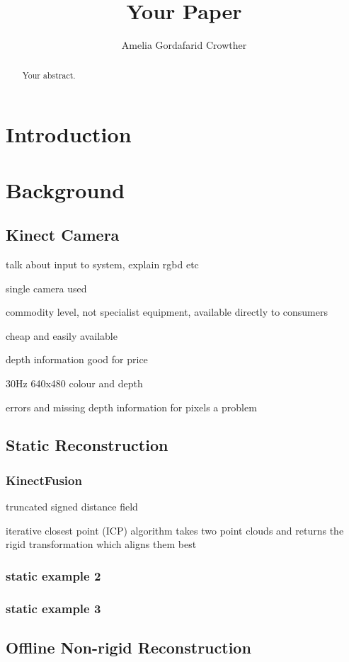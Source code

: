 \documentclass[a4paper]{article}
\title{Your Paper}
\author{Amelia Gordafarid Crowther}
\begin{document}
\begin{abstract}
Your abstract.
\end{abstract}

\section{Introduction}

\section{Background}

\subsection{Kinect Camera}

talk about input to system, explain rgbd etc

single camera used

commodity level, not specialist equipment, available directly to consumers

cheap and easily available

depth information good for price

30Hz 640x480 colour and depth

errors and missing depth information for pixels a problem

\subsection{Static Reconstruction}

\subsubsection{KinectFusion}

truncated signed distance field

iterative closest point (ICP) algorithm takes two point clouds and returns the rigid transformation which aligns them best


\subsubsection{static example 2}

\subsubsection{static example 3}

\subsection{Offline Non-rigid Reconstruction}
\end{document}
